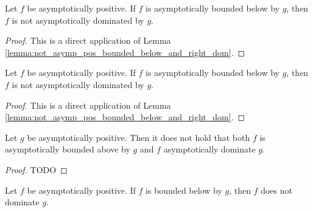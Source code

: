 \begin{theorem}
    \label{thm:not_asymp_right_dom_of_bounded_below_pos}
    \leanok
    Let $f$ be asymptotically positive. If $f$ is asymptotically bounded below by $g$, 
    then $f$ is not asymptotically dominated by $g$.
\end{theorem}

\begin{proof}
    \leanok
    This is a direct application of Lemma \ref{lemma:not_asymp_pos_bounded_below_and_right_dom}. 
\end{proof}

\begin{theorem}
    \label{thm:not_asymp_bounded_below_of_right_dom_pos}
    \leanok
    Let $f$ be asymptotically positive. If $f$ is asymptotically bounded below by $g$, 
    then $f$ is not asymptotically dominated by $g$.
\end{theorem}

\begin{proof}
    \leanok
    This is a direct application of Lemma \ref{lemma:not_asymp_pos_bounded_below_and_right_dom}. 
\end{proof}

\begin{lemma}
    \label{lemma:not_asymp_pos_bounded_above_and_left_dom}
    \leanok
    Let $g$ be asymptotically positive. Then it does not hold that both $f$ is asymptotically 
    bounded above by $g$ and $f$ asymptotically dominate $g$.
\end{lemma}

\begin{proof}
    \leanok
    TODO 
\end{proof}

\begin{theorem}
    \label{thm:not_asymp_left_dom_of_bounded_above_pos}
    \leanok
    Let $f$ be asymptotically positive. If $f$ is bounded below by $g$, then $f$ 
    does not dominate $g$.
\end{theorem}

